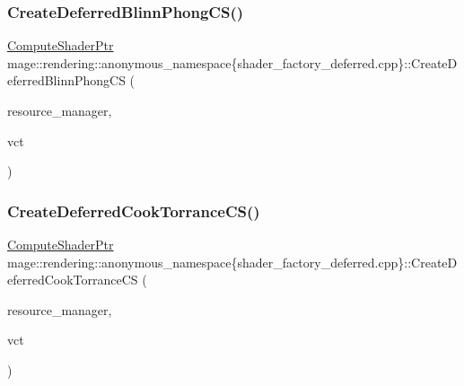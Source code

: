 \subsubsection{\texorpdfstring{Create\+Deferred\+Blinn\+Phong\+C\+S()}{CreateDeferredBlinnPhongCS()}}
{\footnotesize\ttfamily \mbox{\hyperlink{namespacemage_1_1rendering_ab3dc9f2114f2e9255b91d9c051da52ea}{Compute\+Shader\+Ptr}} mage\+::rendering\+::anonymous\+\_\+namespace\{shader\+\_\+factory\+\_\+deferred.\+cpp\}\+::Create\+Deferred\+Blinn\+Phong\+CS (\begin{DoxyParamCaption}\item[{\mbox{\hyperlink{classmage_1_1rendering_1_1_resource_manager}{Resource\+Manager}} \&}]{resource\+\_\+manager,  }\item[{bool}]{vct }\end{DoxyParamCaption})}

\mbox{\label{namespacemage_1_1rendering_1_1anonymous__namespace_02shader__factory__deferred_8cpp_03_a2bd61203935ebc99d11f396914189d91}} 
\subsubsection{\texorpdfstring{Create\+Deferred\+Cook\+Torrance\+C\+S()}{CreateDeferredCookTorranceCS()}}
{\footnotesize\ttfamily \mbox{\hyperlink{namespacemage_1_1rendering_ab3dc9f2114f2e9255b91d9c051da52ea}{Compute\+Shader\+Ptr}} mage\+::rendering\+::anonymous\+\_\+namespace\{shader\+\_\+factory\+\_\+deferred.\+cpp\}\+::Create\+Deferred\+Cook\+Torrance\+CS (\begin{DoxyParamCaption}\item[{\mbox{\hyperlink{classmage_1_1rendering_1_1_resource_manager}{Resource\+Manager}} \&}]{resource\+\_\+manager,  }\item[{bool}]{vct }\end{DoxyParamCaption})}

